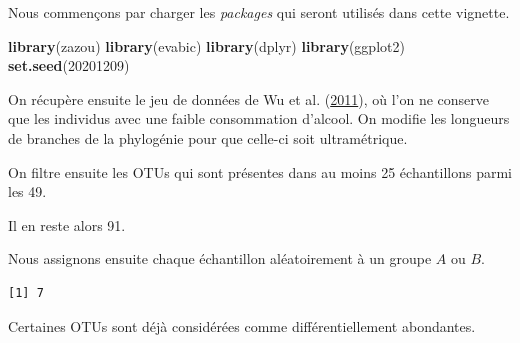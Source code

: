 \documentclass[12pt,a4paper]{reedthesis}
\newenvironment{Shaded}{\begin{snugshade}}{\end{snugshade}}
\newcommand{\DataTypeTok}[1]{\textcolor[rgb]{0.13,0.29,0.53}{#1}}
\newcommand{\DecValTok}[1]{\textcolor[rgb]{0.00,0.00,0.81}{#1}}
\newcommand{\FloatTok}[1]{\textcolor[rgb]{0.00,0.00,0.81}{#1}}
\newcommand{\KeywordTok}[1]{\textcolor[rgb]{0.13,0.29,0.53}{\textbf{#1}}}
\newcommand{\NormalTok}[1]{#1}
\newcommand{\OperatorTok}[1]{\textcolor[rgb]{0.81,0.36,0.00}{\textbf{#1}}}
\newcommand{\OtherTok}[1]{\textcolor[rgb]{0.56,0.35,0.01}{#1}}
\newcommand{\StringTok}[1]{\textcolor[rgb]{0.31,0.60,0.02}{#1}}
\theoremstyle{definition}
\theoremstyle{definition}
\theoremstyle{definition}
\theoremstyle{remark}
\begin{document}
Nous commençons par charger les \emph{packages} qui seront utilisés dans cette vignette.
\begin{Shaded}
\begin{Highlighting}[]
\KeywordTok{library}\NormalTok{(zazou)}
\KeywordTok{library}\NormalTok{(evabic)}
\KeywordTok{library}\NormalTok{(dplyr)}
\KeywordTok{library}\NormalTok{(ggplot2)}
\KeywordTok{set.seed}\NormalTok{(}\DecValTok{20201209}\NormalTok{)}
\end{Highlighting}
\end{Shaded}
On récupère ensuite le jeu de données de Wu et al. (\protect\hyperlink{ref-wu2011linking}{2011}), où l'on ne conserve que les individus avec une faible consommation d'alcool. On modifie les longueurs de branches de la phylogénie pour que celle-ci soit ultramétrique.
\begin{Shaded}
\end{Shaded}
On filtre ensuite les OTUs qui sont présentes dans au moins 25 échantillons parmi les 49.
\begin{Shaded}
\end{Shaded}
Il en reste alors 91.

Nous assignons ensuite chaque échantillon aléatoirement à un groupe \(A\) ou \(B\).
\begin{Shaded}
\end{Shaded}
\begin{verbatim}
[1] 7
\end{verbatim}
Certaines OTUs sont déjà considérées comme différentiellement abondantes.
\end{document}
